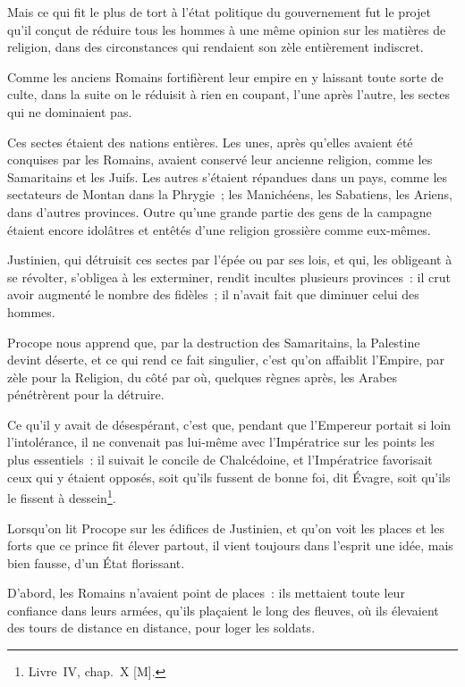\documentclass[french,twoside]{book} %
\begin{document}
Mais ce qui fit le plus de tort à l’état politique du gouvernement fut le projet qu’il conçut de réduire tous les hommes à une même opinion sur les matières de religion, dans des circonstances qui rendaient son zèle entièrement indiscret.\par
Comme les anciens Romains fortifièrent leur empire en y laissant toute sorte de culte, dans la suite on le réduisit à rien en coupant, l’une après l’autre, les sectes qui ne dominaient pas.\par
Ces sectes étaient des nations entières. Les unes, après qu’elles avaient été conquises par les Romains, avaient conservé leur ancienne religion, comme les Samaritains et les Juifs. Les autres s’étaient répandues dans un pays, comme les sectateurs de Montan dans la Phrygie ; les Manichéens, les Sabatiens, les Ariens, dans d’autres provinces. Outre qu’une grande partie des gens de la campagne étaient encore idolâtres et entêtés d’une religion grossière comme eux-mêmes.\par
Justinien, qui détruisit ces sectes par l’épée ou par ses lois, et qui, les obligeant à se révolter, s’obligea à les exterminer, rendit incultes plusieurs provinces : il crut avoir augmenté le nombre des fidèles ; il n’avait fait que diminuer celui des hommes.\par
Procope nous apprend que, par la destruction des Samaritains, la Palestine devint déserte, et ce qui rend ce fait singulier, c’est qu’on affaiblit l’Empire, par zèle pour la Religion, du côté par où, quelques règnes après, les Arabes pénétrèrent pour la détruire.\par
Ce qu’il y avait de désespérant, c’est que, pendant que l’Empereur portait si loin l’intolérance, il ne convenait pas lui-même avec l’Impératrice sur les points les plus essentiels : il suivait le concile de Chalcédoine, et l’Impératrice favorisait ceux qui y étaient opposés, soit qu’ils fussent de bonne foi, dit Évagre, soit qu’ils le fissent à dessein\footnote{Livre IV, chap. X [M].}.\par
Lorsqu’on lit Procope sur les édifices de Justinien, et qu’on voit les places et les forts que ce prince fit élever partout, il vient toujours dans l’esprit une idée, mais bien fausse, d’un État florissant.\par
D’abord, les Romains n’avaient point de places : ils mettaient toute leur confiance dans leurs armées, qu’ils plaçaient le long des fleuves, où ils élevaient des tours de distance en distance, pour loger les soldats.\par
\end{document}

